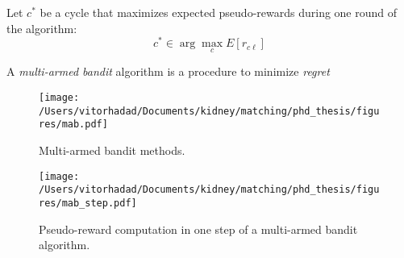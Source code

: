 \documentclass[12pt]{article}
\begin{document}
Let $c^{*}$ be a cycle that maximizes expected pseudo-rewards during one round of the algorithm:
$$c^{*} \in \arg\max_{c} E[r_{c\ell}] $$


 A \emph{multi-armed bandit} algorithm is a procedure to minimize \emph{regret} 


 \begin{figure}
 \centering
 \hspace*{-1cm}
 \texttt{[image: /Users/vitorhadad/Documents/kidney/matching/phd\_thesis/figures/mab.pdf]}
 \caption{Multi-armed bandit methods.}
 \label{fig:mab}
 \end{figure}

 \begin{figure}
 \centering
 \texttt{[image: /Users/vitorhadad/Documents/kidney/matching/phd\_thesis/figures/mab\_step.pdf]}
 \caption{Pseudo-reward computation in one step of a multi-armed bandit algorithm.}
 \label{fig:mab_step}
 \end{figure}
 
  




% 
% 
% 
% 
% 
% 
% 
% 
\end{document}
